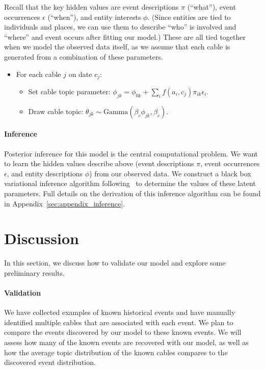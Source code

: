 Recall that the key hidden values are event descriptions $\pi$ (``what''), event occurrences $\epsilon$ (``when''), and entity interests $\phi$.  (Since entities are tied to individuals and places, we can use them to describe ``who'' is involved and ``where'' and event occurs after fitting our model.)  These are all tied together when we model the observed data itself, as we assume that each cable is generated from a combination of these parameters.
\begin{itemize}
\item For each cable $j$ on date $c_j$:
\begin{itemize}
	\item Set cable topic parameter: $\phi_{jk} = \phi_{0k} + \sum_i f(a_i, c_j) \pi_{ik} \epsilon_i$.
	\item Draw cable topic: $\theta_{jk} \sim \mbox{Gamma}(\beta_c \phi_{jk}, \beta_c)$.
\end{itemize}
\end{itemize}



\paragraph{Inference}
Posterior inference for this model is the central computational problem.  We want to learn the hidden values describe above (event descriptions $\pi$, event occurrences $\epsilon$, and entity descriptions $\phi$) from our observed data.  We construct a black box variational inference algorithm following~\citet{Ranganath:2014} to determine the values of these latent parameters.  Full details on the derivation of this inference algorithm can be found in Appendix~\ref{sec:appendix_inference}.

\section{Discussion}
In this section, we discuss how to validate our model and explore some preliminary results.

\paragraph{Validation}
We have collected examples of known historical events and have manually identified multiple cables that are associated with each event.  We plan to compare the events discovered by our model to these known events.  We will assess how many of the known events are recovered with our model, as well as how the average topic distribution of the known cables compares to the discovered event distribution.

